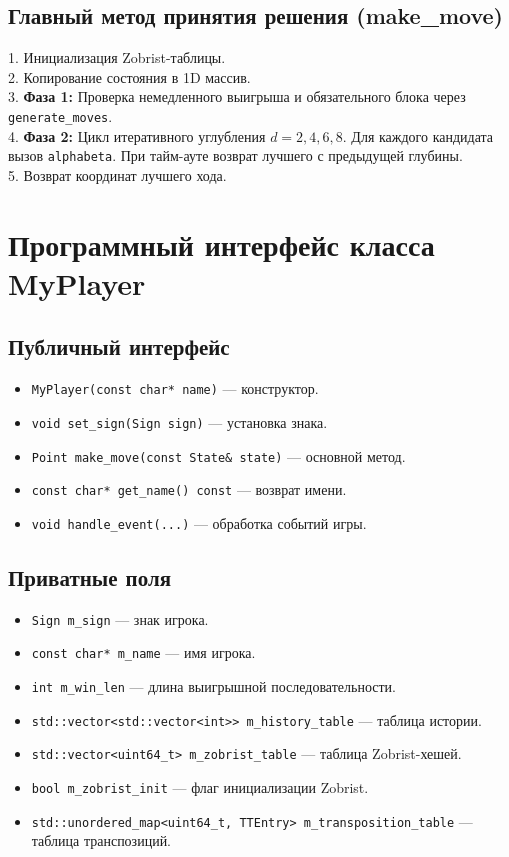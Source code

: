 \documentclass[a4paper,14pt]{extreport}
\begin{document}
\subsection{Главный метод принятия решения (make\_move)}
1. Инициализация Zobrist-таблицы. \\
2. Копирование состояния в 1D массив. \\
3. \textbf{Фаза 1:} Проверка немедленного выигрыша и обязательного блока через \texttt{generate\_moves}. \\
4. \textbf{Фаза 2:} Цикл итеративного углубления $d=2,4,6,8$. Для каждого кандидата вызов \texttt{alphabeta}. При тайм-ауте возврат лучшего с предыдущей глубины. \\
5. Возврат координат лучшего хода.

\section{Программный интерфейс класса MyPlayer}
\subsection{Публичный интерфейс}
\begin{itemize}
    \item \texttt{MyPlayer(const char* name)} — конструктор.
    \item \texttt{void set\_sign(Sign sign)} — установка знака.
    \item \texttt{Point make\_move(const State\& state)} — основной метод.
    \item \texttt{const char* get\_name() const} — возврат имени.
    \item \texttt{void handle\_event(...)} — обработка событий игры.
\end{itemize}

\subsection{Приватные поля}
\begin{itemize}
    \item \texttt{Sign m\_sign} — знак игрока.
    \item \texttt{const char* m\_name} — имя игрока.
    \item \texttt{int m\_win\_len} — длина выигрышной последовательности.
    \item \texttt{std::vector<std::vector<int>> m\_history\_table} — таблица истории.
    \item \texttt{std::vector<uint64\_t> m\_zobrist\_table} — таблица Zobrist-хешей.
    \item \texttt{bool m\_zobrist\_init} — флаг инициализации Zobrist.
    \item \texttt{std::unordered\_map<uint64\_t, TTEntry> m\_transposition\_table} — таблица транспозиций.
\end{itemize}
\end{document}
